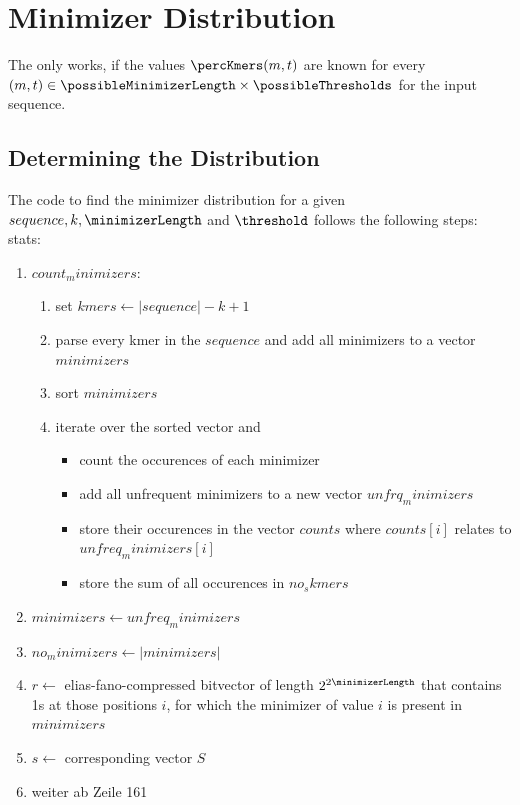 \chapter{Minimizer Distribution}
The  only works, if the values $\percKmers(m,t)$ are known for every $(m,t) \in \possibleMinimizerLength \times \possibleThresholds$ for the input sequence.
\section*{Determining the Distribution}
The code to find the minimizer distribution for a given $sequence, k, \minimizerLength$ and $\threshold$ follows the following steps:\\
stats:\\
\begin{enumerate}
	\item $count_minimizers$:
		\begin{enumerate}
			\item set $kmers \leftarrow |sequence|-k+1$
			\item parse every kmer in the $sequence$ and add all minimizers to a vector $minimizers$ 
			\item sort $minimizers$
			\item iterate over the sorted vector and
			\begin{itemize}
				\item count the occurences of each minimizer
				\item add all unfrequent minimizers to a new vector $unfrq_minimizers$
				\item store their occurences in the vector $counts$ where $counts[i]$ relates to $unfreq_minimizers[i]$
				\item store the sum of all occurences in $no_skmers$
			\end{itemize}
		\end{enumerate}
	\item $minimizers \leftarrow unfreq_minimizers$
	\item $no_minimizers \leftarrow |minimizers|$
	\item $r \leftarrow$ elias-fano-compressed bitvector of length $2^{2\minimizerLength}$ that contains 1s at those positions $i$, for which the minimizer of value $i$ is present in $minimizers$
	\item $s \leftarrow$ corresponding vector $S$
	\item weiter ab Zeile 161
\end{enumerate}
